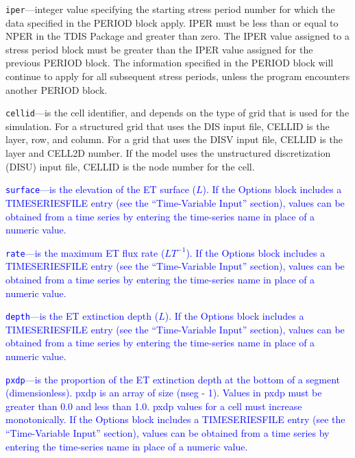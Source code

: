 \begin{description}
\item \texttt{iper}---integer value specifying the starting stress period number for which the data specified in the PERIOD block apply.  IPER must be less than or equal to NPER in the TDIS Package and greater than zero.  The IPER value assigned to a stress period block must be greater than the IPER value assigned for the previous PERIOD block.  The information specified in the PERIOD block will continue to apply for all subsequent stress periods, unless the program encounters another PERIOD block.

\item \texttt{cellid}---is the cell identifier, and depends on the type of grid that is used for the simulation.  For a structured grid that uses the DIS input file, CELLID is the layer, row, and column.   For a grid that uses the DISV input file, CELLID is the layer and CELL2D number.  If the model uses the unstructured discretization (DISU) input file, CELLID is the node number for the cell.

\item \textcolor{blue}{\texttt{surface}---is the elevation of the ET surface ($L$). If the Options block includes a TIMESERIESFILE entry (see the ``Time-Variable Input'' section), values can be obtained from a time series by entering the time-series name in place of a numeric value.}

\item \textcolor{blue}{\texttt{rate}---is the maximum ET flux rate ($LT^{-1}$). If the Options block includes a TIMESERIESFILE entry (see the ``Time-Variable Input'' section), values can be obtained from a time series by entering the time-series name in place of a numeric value.}

\item \textcolor{blue}{\texttt{depth}---is the ET extinction depth ($L$). If the Options block includes a TIMESERIESFILE entry (see the ``Time-Variable Input'' section), values can be obtained from a time series by entering the time-series name in place of a numeric value.}

\item \textcolor{blue}{\texttt{pxdp}---is the proportion of the ET extinction depth at the bottom of a segment (dimensionless). pxdp is an array of size (nseg - 1).  Values in pxdp must be greater than 0.0 and less than 1.0.  pxdp values for a cell must increase monotonically.  If the Options block includes a TIMESERIESFILE entry (see the ``Time-Variable Input'' section), values can be obtained from a time series by entering the time-series name in place of a numeric value.}


\end{description}
